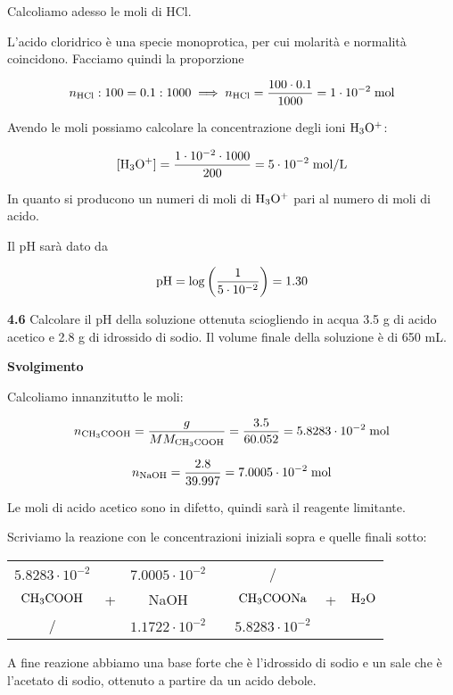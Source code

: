 Calcoliamo adesso le moli di HCl.

L'acido cloridrico è una specie monoprotica, per cui molarità e normalità coincidono. Facciamo quindi la proporzione

$$n_{\rm HCl}:100=0.1:1000
\implies
n_{\rm HCl}=\frac{100 \cdot 0.1}{1000}=1 \cdot 10^{-2} \; \rm mol$$

Avendo le moli possiamo calcolare la concentrazione degli ioni $\rm H_3O^+$:

$$[\rm H_3O^+]=\frac{1 \cdot 10^{-2} \cdot 1000}{200}=5 \cdot 10^{-2} \; mol/L$$

In quanto si producono un numeri di moli di $\rm H_3O^+$ pari al numero di moli di acido.

Il pH sarà dato da

$$\rm pH=\log\left(\frac{1}{5 \cdot 10^{-2}}\right)=1.30$$

\vspace{0.2cm}\textbf{4.6} Calcolare il pH della soluzione ottenuta sciogliendo in acqua 3.5 g di acido acetico e 2.8 g di idrossido di sodio. Il volume finale della soluzione è di 650 mL.

\vspace{0.2cm}\large\textbf{Svolgimento}\normalsize

\vspace{0.2cm}Calcoliamo innanzitutto le moli:

$$n_{\rm CH_3COOH}=\frac{g}{MM_{\rm CH_3COOH}}=\frac{3.5}{60.052}=5.8283 \cdot 10^{-2} \; \rm mol$$

$$n_{\rm NaOH}=\frac{2.8}{39.997}=7.0005 \cdot 10^{-2} \; \rm mol$$

Le moli di acido acetico sono in difetto, quindi sarà il reagente limitante.

Scriviamo la reazione con le concentrazioni iniziali sopra e quelle finali sotto:

\begin{center}
    \begin{tabular}{ccccccc}
        $5.8283 \cdot 10^{-2}$ &  & $7.0005 \cdot 10^{-2}$ & & / &&\\
        $\rm CH_3COOH$ & + & NaOH & \ce{->} & $\rm CH_3COONa$ & + & $\rm H_2O$\\
        / & & $1.1722 \cdot 10^{-2}$ & & $5.8283 \cdot 10^{-2}$&&\\
    \end{tabular}
\end{center}

A fine reazione abbiamo una base forte che è l'idrossido di sodio e un sale che è l'acetato di sodio, ottenuto a partire da un acido debole.

